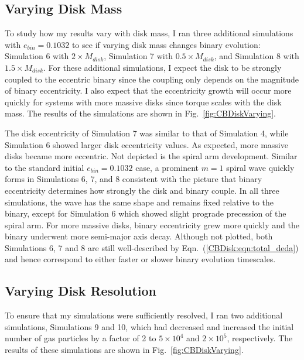 \subsection{Varying Disk Mass} \label{CBDisk:sec:VaryingDiscMass}

To study how my results vary with disk mass, I ran three additional simulations with $e_{bin} =
0.1032$ to see if varying disk mass changes binary evolution: Simulation 6
with $2 \times M_{disk}$, Simulation 7 with $0.5 \times M_{disk}$, and
Simulation 8 with $1.5 \times M_{disk}$.  For these additional simulations, I expect the disk to be strongly coupled to the eccentric binary since the 
coupling only depends on the magnitude of binary eccentricity.  I also expect that the eccentricity growth will occur more quickly for systems with more 
massive disks since torque scales with the disk mass.  The results of the simulations are shown in Fig.~\ref{fig:CBDiskVarying}.

The disk eccentricity of Simulation 7 was similar to that of Simulation 4, while Simulation 6 showed larger disk eccentricity values.  As expected, more massive 
disks became more eccentric.  Not depicted is the spiral arm development.  Similar to the standard initial $e_{bin} = 0.1032$ case, a prominent $m = 1$ spiral 
wave quickly forms in Simulations 6, 7, and 8 consistent with the picture that binary eccentricity determines how strongly the disk and binary couple.  In all three 
simulations, the wave has the same shape and remains fixed relative to the binary, except for Simulation 6 which showed slight prograde precession of the 
spiral arm.  For more massive disks, binary eccentricity grew more quickly and the binary underwent more semi-major axis decay.  Although not plotted, both Simulations 6, 7 and 8 are still well-described by Eqn.~(\ref{CBDisk:eqn:total_deda}) and hence correspond to either faster or slower binary evolution timescales.  


\subsection{Varying Disk Resolution} \label{CBDisk:sec:VaryingDiscResolution}

To ensure that my simulations were sufficiently resolved, I ran two additional simulations, Simulations 9 and 10, which had decreased and increased
 the initial number of gas particles by a factor of 2 to $5 \times 10^4$ and $2 \times 10^5$, respectively.  The results of these simulations are shown in Fig.~\ref{fig:CBDiskVarying}.
 

